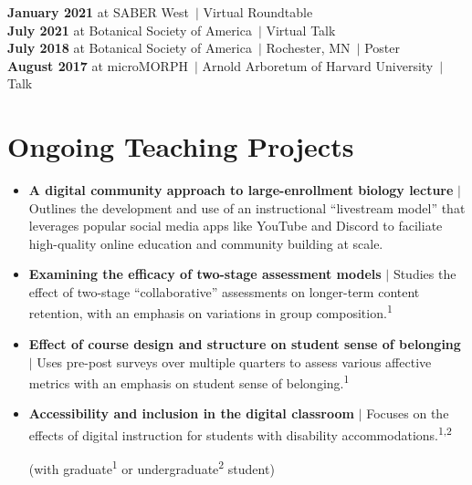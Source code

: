 \documentclass[]{article}
\providecommand{\tightlist}{%
  \setlength{\itemsep}{0pt}\setlength{\parskip}{3pt}}
\begin{document}
\textbf{January 2021} at SABER West\ $\vert$ Virtual Roundtable \hspace{0.4mm} \href{https://ledelaney.org/talks/2021saberw/}{\faImages} \href{https://github.com/ledelaney/01-21-SABERwest}{\faGithub}\\
\textbf{July 2021} at Botanical Society of America\ $\vert$ Virtual Talk \hspace{0.3mm} \href{https://ledelaney.org/talks/2021botany}{\faImages} \href{https://github.com/ledelaney/07-21-Botany}{\faGithub}\\
\textbf{July 2018} at Botanical Society of America\ $\vert$ Rochester, MN\ $\vert$ Poster \hspace{0.4mm} \href{https://ledelaney.org/static/posters/poster.png}{\faFileImage}\\
\textbf{August 2017} at microMORPH\ $\vert$ Arnold Arboretum of Harvard University\ $\vert$ Talk \hspace{0.4mm} \href{https://www.dropbox.com/s/o7hcg5riw97wf9i/08-2017-microMORPH.pdf?dl=1}{\faImages}

\renewcommand{\baselinestretch}{1.0}\normalsize

\newpage


\section{\fontsize{16}{48}\selectfont Ongoing Teaching Projects}

\vspace{1.5mm}

\begin{itemize}
\tightlist

\item{\textbf{A digital community approach to large-enrollment biology lecture} $\vert$ Outlines the development and use of an instructional ``livestream model'' that leverages popular social media apps like YouTube and Discord to faciliate high-quality online education and community building at scale.}

\item{\textbf{Examining the efficacy of two-stage assessment models} $\vert$ Studies the effect of two-stage ``collaborative'' assessments on longer-term content retention, with an emphasis on variations in group composition.\textsuperscript{1}}

\item{\textbf{Effect of course design and structure on student sense of belonging} $\vert$ Uses pre-post surveys over multiple quarters to assess various affective metrics with an emphasis on student sense of belonging.\textsuperscript{1}}

\item{\textbf{Accessibility and inclusion in the digital classroom} $\vert$ Focuses on the effects of digital instruction for students with disability accommodations.\textsuperscript{1,2}}

\vspace{-0.6mm}
\hfill{\footnotesize (with graduate\textsuperscript{1} or undergraduate\textsuperscript{2} student)}

\end{itemize}
\end{document}
